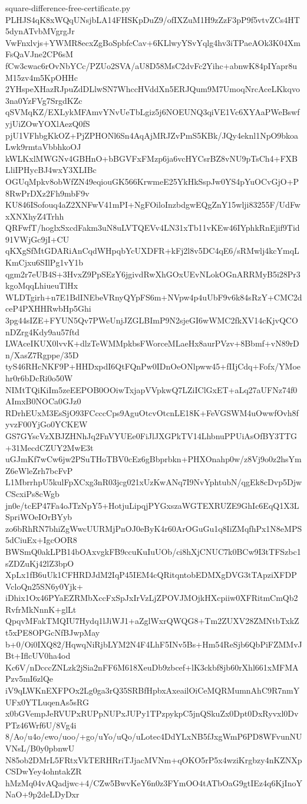 \documentclass[11pt]{article}
\theoremstyle{definition}
\theoremstyle{remark}
\begin{document}
\begin{filecontents*}[overwrite]{square-difference-free-certificate.py}
PLHJS4qK8xWQqUNsjbLA14FHSKpDuZ9/ofIXZuM1H9zZzF3pP9f5vtvZCs4HT5dynATvbMVgrgJr
VwFnxlvjs+YWMR8ecxZgBoSpbfcCav+6KLlwyYSvYqlg4hv3iTPaeAOk3K04XmFsQaVJne2CP6sM
fCw3cwac6rOvNbYCc/PZUo2SVA/aU8D58MsC2dvFc2Yihc+abnwK84pIYapr8uM15zv4m5KpOHHc
2YHspeXHazRJpuZdDLlwSN7WhccHVddXn5ERJQum9M7UmoqNrcAceLKkqvo3na0YzFVg7SrgdKZc
qSVMqKZ/EXLykMFAmvYNvUeTbLgiz5j6NOEUNQ3qiVE1Vc6XYAaPWeBswfyjUiZOwYOXlAezQ0fS
pjU1VFhbgKkOZ+PjZPHONl6Sn4AqAjMRJZvPmS5KBk/JQy4eknl1NpO9bkoaLwk9rmtaVbbhkoOJ
kWLKxlMWGNv4GBHnO+bBGVFxFMzp6ja6vcHYCsrBZ8vNU9pTsCh4+FXBLliIPHycBJ4wxY3XLIBc
OGUqMpkv8obWfZN49eqiouGK566KrwmeE25YkHkSspJw0YS4pYuOCvGjO+P8RwPrDXz2Fh9mbF9v
KU846ISofouq4aZ2XNFwV41mPI+NgFOiloInzbdgwEQgZnY15wlji83255F/UdFwxXNXhyZ4Trhh
QRFwfT/hoglxSxcdFakm3uN8uLVTQEVv4LN31xTb11vKEw46IYphkRnEjif9Tid91VWjGc9jI+CU
qKXgSfMtGDARiAnCqdWHpqbYcUXDFR+kFj2l8v5DC4qE6/sRMwlj4kcYmqLKmCjxu6SIlPg1vY1b
qgm2r7eUB4S+3HvxZ9PpSEzY6jgivdRwXhGOxUEvNLokOGnARRMyB5i28Pr3kgoMqqLhiueuTlHx
WLDTgirh+n7E1BdINEbeVRnyQYpFS6m+NVpw4p4uUbF9v6k84sRzY+CMC2dceP4PXHHRwbHp5Ghi
3pg44sIZE+FYUN5Qv7PWeUnjJZGLBImP9N2sjeGI6wWMC2fkXV14cKjvQCOnDZrg4Kdy9au57ftd
LWAceIKUX0lvvK+dlzTeWMMpkbsFWorceMLaeHx8aurPVzv+8Bbmf+vN89rDn/XasZ7Rgppe/35D
tyS46RHcNKF9P+HHDxpdI6QtFQnPw0IDnOeONlpww45+fIIjCdq+Fofx/YMoehr0r6bDcRi0o50W
NIMtTQiKiIm5zeEEPOB0OOiwTxjapVVpkwQ7LZiIClGxET+aLq27aUFNz74f0AImxB0NOCa0GJz0
RDrhEUxM3EsSjO93FCcccCps9AguOtcvOtcnLE18K+FeVGSWM4uOwwfOvh8fyvzF00YjGo0YCKEW
GS7GYscVzXBJZHNhJq2FnVYUEe0FiJlJXGPkTV14LhbnuPPUiAsOfBY3TTG+31MecdCZUY2MwE3t
uGJmKf7wCw6jw2PSuTHoTBV0cEz6gBbprbkn+PHXOnahp0w/z8Vj9o0z2hsYmZ6eWleZrh7bcFvP
L1MbrrhpU5kulFpXCxg3nR03jcg021xUzKwANq7I9NvYphtubN/qgEk8cDvp5DjwCScxiPs8cWgb
jn0e/tcEP47Fa4oJTzNpY5+HotjuLipqjPYGxszaWGTEXRUZE9GhIc6EqQ1X3LSpriWOeIOrBYyb
zo6bRhRN7bhiZgWwcUURMjPnOJ0eByK4r60ArOGuGu1q8IiZMqfhPx1N8eMPS5dCiuEx+IgcOOR8
BWSmQ0akLPB14bOAxvgkFB9ccuKuIuUOb/ci8hXjCNUC7k0BCw9I3tTFSzbc1sZDZuKj42lZ3bpO
XpLx1fB6uUk1CFHRDJdM2IqP45IEM4cQRitqntobEDMXgDVG3tTApziXFDPVcloQn25SN6y0Yjk+
iDhix1Ox46PYaEZRMbXccFxSpJxIrVzLjZPOVJMOjkHXcpiiw0XFRitmCmQb2RvfrMkNnnK+glLt
QpqvMFakTMQIU7Hydq1lJiWJ1+aZglWxrQWQG8+Tm2ZUXV28ZMNtbTxkZt5xPE8OPGcNfBJwpMay
b+0/Oi0IXQ82/HqwqNiRjbLYM2N4F4LhF5INv5Bs+Hm54ReSjb6QbPiFZMMvJBt+IflcUV0ha4od
Kc6V/nDcccZNLzk2jSia2nFF6M618XeuDb9zbcef+lK3ckbf8jb60rXhl661xMFMAPzv5mI6zlQe
iV9qLWKnEXFPOx2Lg0ga3rQ35SRBfHpbxAxeailOiCeMQRMumnAhC9R7nmYUFx0YTLuqenAs5sRG
x0bGVempJeRVUPxRUPpNUPxJUPy1TPzpykpC5jnQSkuZx0Dpt0DxRyvxl0DvPTz46Wrf6U/8Vg4i
8/Ao/u4o/ewo/uoo/+go/uYo/uQo/uLotec4DdYLxNB5fJxgWmP6PD8WFvunNUVNsL/B0y0pbnwU
N85ob2DMrL5FRtxVkTERHRriTJjacMVNm+qOKO5rP5x4wziKrgbzy4nKZNXpCSDwYey4ohntakZR
hMzMq04vAQadjwc+4/CZw5BwvKeY6n0z3FYmOO4tATbOaG9gtIEz4q6KjInoYNaO+9p2deLDyDxr

\end{filecontents*}
\end{document}
